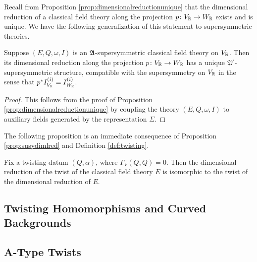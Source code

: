 \documentclass[10pt, oneside]{article}
\begin{document}
Recall from Proposition \ref{prop:dimensionalreductionunique} that the dimensional reduction of a classical field theory along the projection $p\colon V_\mathbb R\rightarrow W_\mathbb R$ exists and is unique. We have the following generalization of this statement to supersymmetric theories.

\begin{prop} \label{prop:susydimlred}
Suppose $(E, Q, \omega, I)$ is an $\mathfrak{A}$-supersymmetric classical field theory on $V_\mathbb R$. Then its dimensional reduction along the projection $p\colon V_\mathbb R\rightarrow W_\mathbb R$ has a unique $\mathfrak{A}'$-supersymmetric structure, compatible with the supersymmetry on $V_\mathbb R$ in the sense that $p^*I^{(i)}_{V_\mathbb R} = I^{(i)}_{W_\mathbb R}$.
\end{prop}

\begin{proof}
This follows from the proof of Proposition \ref{prop:dimensionalreductionunique} by coupling the theory $(E, Q, \omega, I)$ to auxiliary fields generated by the representation $\Sigma$.
\end{proof}

The following proposition is an immediate consequence of Proposition \ref{prop:susydimlred} and Definition \ref{def:twisting}.

\begin{prop}
Fix a twisting datum $(Q, \alpha)$, where $\Gamma_V(Q, Q) = 0$. Then the dimensional reduction of the twist of the classical field theory $E$ is isomorphic to the twist of the dimensional reduction of $E$.
\label{prop:twistdimensionalreduction}
\end{prop}

\subsection{Twisting Homomorphisms and Curved Backgrounds}

\subsection{A-Type Twists} \label{A_twist_section}

\end{document}
